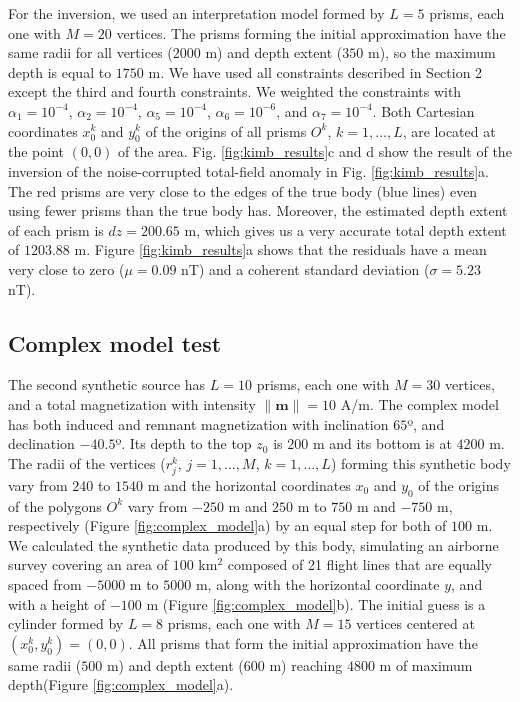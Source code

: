 For the inversion, we used an interpretation model formed by $L=5$ prisms, each one with $M=20$ vertices. The prisms forming the initial approximation have the same radii for all vertices ($2000$ m) and depth extent ($350$ m), so the maximum depth is equal to $1750$ m. We have used all constraints described in Section 2 except the third and fourth constraints. We weighted the constraints with $\alpha_1 = 10^{-4}$, $\alpha_2 = 10^{-4}$, $\alpha_5 = 10^{-4}$, $\alpha_6 = 10^{-6}$, and $\alpha_7 = 10^{-4}$. Both Cartesian coordinates $x_0^k$ and $y_0^k$ of the origins of all prisms $O^k$, $k=1,\dots,L$, are located at the point $(0,0)$ of the area. Fig. \ref{fig:kimb_results}c and d show the result of the inversion of the noise-corrupted total-field anomaly in Fig. \ref{fig:kimb_results}a. The red prisms are very close to the edges of the true body (blue lines) even using fewer prisms than the true body has. Moreover, the estimated depth extent of each prism is $dz = 200.65$ m, which gives us a very accurate total depth extent of $1203.88$ m. Figure \ref{fig:kimb_results}a shows that the residuals have a mean very close to zero ($\mu=0.09$ nT) and a coherent standard deviation ($\sigma=5.23$ nT).



\subsection{Complex model test}

The second synthetic source has $L=10$ prisms, each one with $M=30$ vertices, and a total magnetization with intensity $\|\mathbf{m}\| =10$ A/m. The complex model has both induced and remnant magnetization with inclination $65$º, and declination $-40.5$º. Its depth to the top $z_0$ is $200$ m and its bottom is at $4200$ m. The radii of the vertices ($r_j^k$, $j=1,\dots,M$, $k=1,\dots,L$) forming this synthetic body vary from $240$ to $1540$ m and the horizontal coordinates $x_0$ and $y_0$ of the origins of the polygons $O^k$ vary from $-250$ m and $250$ m to $750$ m and $-750$ m, respectively (Figure \ref{fig:complex_model}a) by an equal step for both of $100$ m. We calculated the synthetic data produced by this body, simulating an airborne survey covering an area of $100$ km$^2$ composed of 21 flight lines that are equally spaced from $-5000$ m to $5000$ m, along with the horizontal coordinate $y$, and with a height of $-100$ m (Figure \ref{fig:complex_model}b). The initial guess is a cylinder formed by $L=8$ prisms, each one with $M=15$ vertices centered at $(x_0^k, y_0^k) = (0,0)$. All prisms that form the initial approximation have the same radii ($500$ m) and depth extent ($600$ m) reaching $4800$ m of maximum depth(Figure \ref{fig:complex_model}a).

